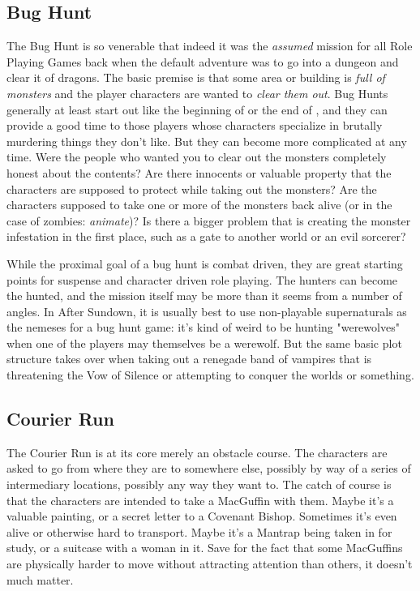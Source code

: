 \subsection{Bug Hunt}

The Bug Hunt is so venerable that indeed it was the \textit{assumed} mission for all Role Playing Games back when the default adventure was to go into a dungeon and clear it of dragons. The basic premise is that some area or building is \textit{full of monsters} and the player characters are wanted to \textit{clear them out}. Bug Hunts generally at least start out like the beginning of  or the end of , and they can provide a good time to those players whose characters specialize in brutally murdering things they don't like. But they can become more complicated at any time. Were the people who wanted you to clear out the monsters completely honest about the contents? Are there innocents or valuable property that the characters are supposed to protect while taking out the monsters? Are the characters supposed to take one or more of the monsters back alive (or in the case of zombies: \textit{animate})? Is there a bigger problem that is creating the monster infestation in the first place, such as a gate to another world or an evil sorcerer?

While the proximal goal of a bug hunt is combat driven, they are great starting points for suspense and character driven role playing. The hunters can become the hunted, and the mission itself may be more than it seems from a number of angles. In After Sundown, it is usually best to use non-playable supernaturals as the nemeses for a bug hunt game: it's kind of weird to be hunting "werewolves" when one of the players may themselves be a werewolf. But the same basic plot structure takes over when taking out a renegade band of vampires that is threatening the Vow of Silence or attempting to conquer the worlds or something.

\subsection{Courier Run}

The Courier Run is at its core merely an obstacle course. The characters are asked to go from where they are to somewhere else, possibly by way of a series of intermediary locations, possibly any way they want to. The catch of course is that the characters are intended to take a MacGuffin with them. Maybe it's a valuable painting, or a secret letter to a Covenant Bishop. Sometimes it's even alive or otherwise hard to transport. Maybe it's a Mantrap being taken in for study, or a suitcase with a woman in it. Save for the fact that some MacGuffins are physically harder to move without attracting attention than others, it doesn't much matter.

